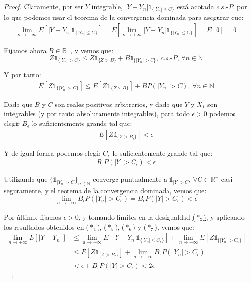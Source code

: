 \begin{proof}
Claramente, por ser $Y$ integrable, $|Y-Y_n|\mathds{1}_{\{|Y_n|\leq C\}}$ está acotada $c.s.\text{-}P$, por lo que podemos usar el teorema de la convergencia dominada para asegurar que:
\begin{gather}\tag{$*_4$}\label{aux4}
\lim_{n\to +\infty} E[|Y-Y_n|\mathds{1}_{\{|Y_n|\leq C\}}] = E[\lim_{n\to +\infty} |Y-Y_n|\mathds{1}_{\{|Y_n|\leq C\}}] = E[0] = 0
\end{gather}

Fijamos ahora $B\in\mathds{R}^+$, y vemos que:
$$Z\mathds{1}_{\{|Y_n|> C\}}\leq Z\mathds{1}_{\{Z> B\}} + B \mathds{1}_{\{|Y_n|> C\}} \text{, } c.s.\text{-}P \text{, }\forall n\in\mathds{N}$$

Y por tanto:
\begin{gather}\tag{$*_5$}\label{aux5}
E[Z\mathds{1}_{\{|Y_n|> C\}}]\leq E[Z\mathds{1}_{\{Z> B\}}] + BP(|Y_n|>C)\text{, }\forall n\in\mathds{N}
\end{gather}

Dado que $B$ y $C$ son reales positivos arbitrarios, y dado que $Y$ y $X_1$ son integrables (y por tanto absolutamente integrables), para todo $\epsilon>0$ podemos elegir $B_{\epsilon}$ lo suficientemente grande tal que:
\begin{gather}\tag{$*_6$}\label{aux6}
E[Z\mathds{1}_{\{Z> B_{\epsilon}\}}]<\epsilon
\end{gather}

Y de igual forma podemos elegir $C_{\epsilon}$ lo suficientemente grande tal que:
\begin{gather}\tag{$*_7$}\label{aux7}
B_{\epsilon}P(|Y|>C_{\epsilon})<\epsilon
\end{gather}

Utilizando que $\{\mathds{1}_{|Y_n|>C}\}_{n\in\mathds{N}}$ converge puntualmente a $\mathds{1}_{|Y|>C}$, $\forall C\in\mathds{R}^+$ casi seguramente, y el teorema de la convergencia dominada, vemos que:
$$ \lim_{n\to +\infty} B_{\epsilon}P(|Y_n|>C_{\epsilon}) = B_{\epsilon}P(|Y|>C_{\epsilon})< \epsilon $$

Por último, fijamos $\epsilon>0$, y tomando límites en la desigualdad \hyperref[aux3]{($*_3$)}, y aplicando los resultados obtenidos en \hyperref[aux4]{($*_4$)}, \hyperref[aux5]{($*_5$)}, \hyperref[aux6]{($*_6$)} y \hyperref[aux7]{($*_7$)}, vemos que:
\begin{align*}
\lim_{n\to +\infty}E[|Y-Y_n|] & \leq \lim_{n\to +\infty} E[|Y-Y_n|\mathds{1}_{\{|Y_n|\leq C_{\epsilon }\}}] + \lim_{n\to +\infty} E[Z\mathds{1}_{\{|Y_n|> C_{\epsilon}\}}]\\
& \leq E[Z\mathds{1}_{\{Z> B_{\epsilon}\}}] + \lim_{n\to +\infty} B_{\epsilon}P(|Y_n|>C_{\epsilon})\\
&< \epsilon + B_{\epsilon}P(|Y|>C_{\epsilon}) < 2\epsilon 
\end{align*}


\end{proof}
